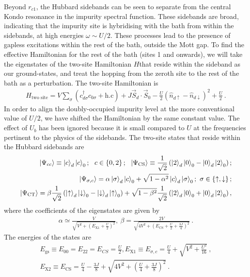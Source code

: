 \documentclass{iopart}
\begin{document}
Beyond \(r_{c1}\), the Hubbard sidebands can be seen to separate from the central Kondo resonance in the impurity spectral function. These sidebands are broad, indicating that the impurity site is hybridising with the bath from within the sidebands, at high energies \(\omega \sim U/2\). These processes lead to the presence of gapless excitations within the rest of the bath, outside the Mott gap. To find the effective Hamiltonian for the rest of the bath (sites 1 and onwards), we will take the eigenstates of the two-site Hamiltonian \(H\)that reside within the sideband as our ground-states, and treat the hopping from the zeroth site to the rest of the bath as a perturbation. The two-site Hamiltonian is
\begin{eqnarray}
	H_\text{two site} = V\sum_\sigma\left(c^\dagger_{d\sigma} c_{0\sigma} + \text{h.c}\right) + J \vec{S}_d\cdot\vec{S}_0 - \frac{U}{2} \left( \hat n_{d \uparrow} - \hat n_{d\downarrow} \right)^2 + \frac{U}{2}~.
\end{eqnarray}
In order to align the doubly-occupied impurity level at the more conventional value of \(U/2\), we have shifted the Hamiltonian by the same constant value. The effect of \(U_b\) has been ignored because it is small compared to \(U\) at the frequencies pertinent to the physics of the sidebands. 
The two-site states that reside within the Hubbard sidebands are
\begin{eqnarray}\label{gs-sideband}
	\ket{\Psi_{cc}} \equiv \ket{c}_d\ket{c}_0; ~ ~ c \in \left\{0,2\right\}; ~ ~\ket{\Psi_\text{CS}} \equiv \frac{1}{\sqrt 2}\left(\ket{2}_d\ket{0}_0 - \ket{0}_d\ket{2}_0\right);\nonumber \\
	\ket{\Psi_{\sigma,c}} = \alpha\ket{\sigma}_d\ket{c}_0 + \sqrt{1 - \alpha^2}\ket{c}_d\ket{\sigma}_0; ~ \sigma \in \left\{\uparrow,\downarrow\right\}; \nonumber\\
	\ket{\Psi_\text{CT}} = \beta\frac{1}{\sqrt 2}\left(\ket{\uparrow}_d\ket{\downarrow}_0 - \ket{\downarrow}_d\ket{\uparrow}_0\right) + \sqrt{1 - \beta^2}\frac{1}{\sqrt 2}\left(\ket{2}_d\ket{0}_0 + \ket{0}_d\ket{2}_0\right),
\end{eqnarray}
where the coefficients of the eigenstates are given by
\begin{eqnarray}
	\alpha \simeq \frac{V}{\sqrt{V^2 + \left(E_\text{X1} + \frac{U}{2}\right)^2 }},  ~ \beta = \frac{2V}{\sqrt{4V^2 + \left(E_\text{CS} + \frac{U}{2} + \frac{3J}{4}\right)^2}}~.
\end{eqnarray}
The energies of the states are
\begin{eqnarray}
	E_\text{gs} \equiv E_{00} = E_{22} = E_{CS} = \frac{U}{2}, E_\text{X1} \equiv E_{\sigma,c} = \frac{U}{4} + \sqrt{V^2 + \frac{U^2}{16}}~, \nonumber\\
	E_\text{X2} \equiv E_\text{CS} = \frac{U}{4} - \frac{3J}{8} + \sqrt{4V^2 + \left(\frac{U}{4} + \frac{3J}{8}\right)^2}~.
\end{eqnarray}
\end{document}
